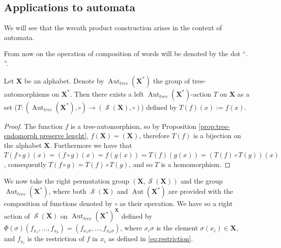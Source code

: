 \documentclass[mat1]{fmfdeloTS2.0}
\newcommand{\abece}{\mathbf{X}}			%
\newcommand{\fslovar}{\mathbf{X^*}}		%
\DeclareMathOperator{\aut}{\mathrm{Aut}}		%
\DeclareMathOperator{\symm}{\mathcal{S}}		%
\begin{document}
\smallskip
\subsection{Applications to automata}
We will see that the wreath product construction arises in the context of automata.

\begin{remark}
From now on the operation of composition of words will be denoted by the dot ``$.$''.
\end{remark}

\begin{proposition}\label{prop:isom T}
Let $\abece$ be an alphabet. Denote by $\aut_{tree}(\fslovar)$ the group of tree-automorphisms on $\fslovar$. Then there exists a left $\aut_{tree}(\fslovar)$-action $T$ on $\abece$ as a set ($T: (\aut_{tree}(\fslovar),\circ)\longrightarrow(\symm(\abece),\circ)$) defined by $T(f)(x):=f(x)$.
\end{proposition}
\begin{proof}
The function $f$ is a tree-automorphism, so by Proposition \autoref{prop:tree-endomorph preserve lenght}, $f(\abece)=(\abece)$, therefore $T(f)$ is a bijection on the alphabet $\abece$. Furthermore we have that $T(f\circ g)(x)=(f\circ g)(x)=f(g(x))=T(f)(g(x))=(T(f)\circ T(g))(x)$, consequently $T(f\circ g)=T(f)\circ T(g)$, and so $T$ is a homomorphism.
\end{proof}

We now take the right permutation group $(\abece,\symm(\abece))$ and the group $\aut_{tree}(\fslovar)$, where both $\symm(\abece)$ and $\aut(\fslovar)$ are provided with the composition of functions denoted by $\circ$ as their operation. 
We have so a right action of $\symm(\abece)$ on $\aut_{tree}(\fslovar)^{\abece}$ defined by $\Phi(\sigma)(f_{x_1},\ldots,f_{x_k})=(f_{x_1\sigma},\ldots,f_{x_k\sigma})$, where $x_i\sigma$ is the element $\sigma(x_i)\in\abece$, and $f_{x_i}$ is the restriction of $f$ in $x_i$ as defined in \eqref{eq:restriction}.
\end{document}
